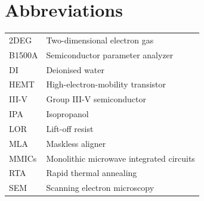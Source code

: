 \cleardoublepage
\chapter*{Abbreviations}
\begin{tabular}{@{}ll@{}}
  2DEG & Two-dimensional electron gas \\
  B1500A & Semiconductor parameter analyzer \\
  DI & Deionised water \\
  HEMT & High-electron-mobility transistor \\
  III-V & Group III-V semiconductor \\
  IPA & Isopropanol \\
  LOR & Lift-off resist \\
  MLA & Maskless aligner \\
  MMICs & Monolithic microwave integrated circuits \\
  RTA & Rapid thermal annealing \\
  SEM & Scanning electron microscopy \\
\end{tabular}
